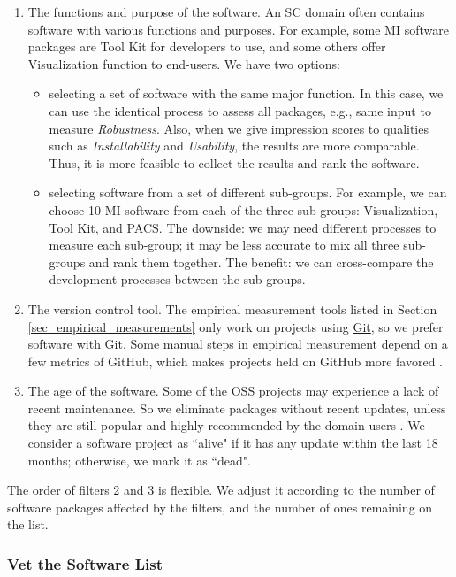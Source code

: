 \documentclass[preprint,12pt,authoryear]{elsarticle}
\begin{document}
\begin{enumerate}
\item The functions and purpose of the software. An SC domain often contains
software with various functions and purposes. For example, some MI software
packages are Tool Kit for developers to use, and some others offer Visualization
function to end-users. We have two options:
\begin{itemize}
\item selecting a set of software with the same major function. In this case, we
can use the identical process to assess all packages, e.g., same input to
measure \textit{Robustness}. Also, when we give impression scores to qualities
such as \textit{Installability} and \textit{Usability}, the results are more
comparable. Thus, it is more feasible to collect the results and rank the
software.
\item selecting software from a set of different sub-groups. For example, we can
choose 10 MI software from each of the three sub-groups: Visualization, Tool
Kit, and PACS. The downside: we may need different processes to measure each
sub-group; it may be less accurate to mix all three sub-groups and rank them
together. The benefit: we can cross-compare the development processes between
the sub-groups.
\end{itemize}

\item The version control tool. The empirical measurement tools listed in
Section \ref{sec_empirical_measurements} only work on projects using
\hyperlink{https://git-scm.com/}{Git}, so we prefer software with Git. Some
manual steps in empirical measurement depend on a few metrics of GitHub, which
makes projects held on GitHub more favored \citep{SmithEtAl2021}.

\item The age of the software. Some of the OSS projects may experience a lack of
recent maintenance. So we eliminate packages without recent updates, unless they
are still popular and highly recommended by the domain users
\citep{SmithEtAl2021}. We consider a software project as ``alive" if it has any
update within the last 18 months; otherwise, we mark it as ``dead".
\end{enumerate}

The order of filters 2 and 3 is flexible. We adjust it according to the number
of software packages affected by the filters, and the number of ones remaining
on the list.

\subsubsection{Vet the Software List} \label{sec_vet_software_list}
\end{document}
